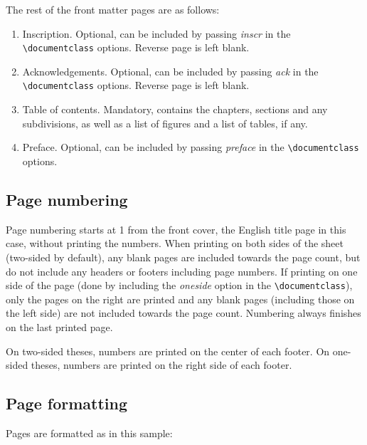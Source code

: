 \documentclass[en,inscr,ack,preface]{dimscthesis}
\begin{document}
The rest of the front matter pages are as follows:

\begin{enumerate}
    \item Inscription.
    Optional, can be included by passing \emph{inscr} in the \verb|\documentclass| options.
    Reverse page is left blank.
    \item Acknowledgements.
    Optional, can be included by passing \emph{ack} in the \verb|\documentclass| options.
    Reverse page is left blank.
    \item Table of contents.
    Mandatory, contains the chapters, sections and any subdivisions, as well as a list of figures and a list of tables, if any.
    \item Preface.
    Optional, can be included by passing \emph{preface} in the \verb|\documentclass| options.
\end{enumerate}

\subsection{Page numbering} \label{page_numbering}

Page numbering starts at 1 from the front cover, the English title page in this case, without printing the numbers.
When printing on both sides of the sheet (two-sided by default), any blank pages are included towards the page count, but do not include any headers or footers including page numbers.
If printing on one side of the page (done by including the \emph{oneside} option in the \verb|\documentclass|), only the pages on the right are printed and any blank pages (including those on the left side) are not included towards the page count.
Numbering always finishes on the last printed page.

On two-sided theses, numbers are printed on the center of each footer.
On one-sided theses, numbers are printed on the right side of each footer.

\subsection{Page formatting} \label{page_formatting}

Pages are formatted as in this sample:
\end{document}
